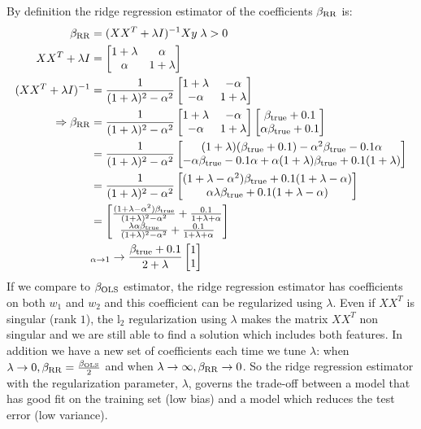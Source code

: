 \documentclass[12pt,twoside]{article}
\begin{document}
\begin{enumerate}
\begin{enumerate}
  \medskip
  By definition the ridge regression estimator of the coefficients $\beta_{\operatorname{RR}}$ is:
 \begin{align*}
 	\beta_{\operatorname{RR}}				&=	(X X^T + \lambda I)^{-1}	X y	\; \lambda > 0	\\
	X X^T + \lambda I			&=	\begin{bmatrix} 1+ \lambda & \alpha \\ \alpha  &1+ \lambda \end{bmatrix} \\
	(X X^T + \lambda I)^{-1}		&=	\frac{1}{(1 + \lambda)^2 - \alpha^2} \begin{bmatrix} 1+ \lambda & -\alpha \\ -\alpha & 1+ \lambda \end{bmatrix} \\	
	\Rightarrow \beta_{\operatorname{RR}}	&=	\frac{1}{(1 + \lambda)^2 - \alpha^2} \begin{bmatrix} 1+ \lambda & -\alpha \\ -\alpha & 1+ \lambda \end{bmatrix} \begin{bmatrix} \beta_{\operatorname{true}} + 0.1 \\ \alpha \beta_{\operatorname{true}} + 0.1 \end{bmatrix} \\
							&=	\frac{1}{(1 + \lambda)^2 - \alpha^2}  \begin{bmatrix} (1+ \lambda) (\beta_{\operatorname{true}} + 0.1) -\alpha^2  \beta_{\operatorname{true}} -0.1 \alpha \\
																-\alpha \beta_{\operatorname{true}}  -0.1 \alpha + \alpha (1+\lambda) \beta_{\operatorname{true}}  + 0.1 (1 + \lambda)  \end{bmatrix} \\
							&=	\frac{1}{(1 + \lambda)^2 - \alpha^2}  \begin{bmatrix} (1+ \lambda  -\alpha^2) \beta_{\operatorname{true}}  + 0.1 (1+ \lambda  -\alpha) \\ 			
																\alpha \lambda \beta_{\operatorname{true}} + 0.1 (1+ \lambda  -\alpha) \end{bmatrix} \\
							&=	 \begin{bmatrix} \frac{(1+ \lambda  -\alpha^2) \beta_{\operatorname{true}}} {(1 + \lambda)^2 - \alpha^2} + \frac{0.1} {1 + \lambda + \alpha} \\
									\frac{ \lambda \alpha  \beta_{\operatorname{true}}} {(1 + \lambda)^2 - \alpha^2} + \frac{0.1} {1 + \lambda + \alpha}  \end{bmatrix} \\
							&_{\alpha \rightarrow 1}\rightarrow \frac{ \beta_{\operatorname{true}} + 0.1}{ 2 + \lambda} \begin{bmatrix} 1  \\ 1 \end{bmatrix} 
 \end{align*} 
If we compare to $\beta_{\operatorname{OLS}}$ estimator,  the ridge regression estimator has coefficients on both $w_1$ and $w_2$ and this coefficient can be regularized using $\lambda$. Even if $XX^T$ is singular (rank $1$), the l$_2$ regularization 
using $\lambda$ makes the matrix $XX^T$ non singular and we are still able to find a solution which includes both features. In addition we have a new set of coefficients each time we tune $\lambda$:
when $\lambda \rightarrow 0, \beta_{\operatorname{RR}} = \frac{\beta_{\operatorname{OLS}}} {2}$ and when $\lambda \rightarrow \infty, \beta_{\operatorname{RR}} \rightarrow 0$. So the ridge regression estimator with the regularization parameter, $\lambda$,
governs the trade-off between a model that has good fit on the training set (low bias) and a model which reduces the test error (low variance). 
 

\end{enumerate}
\end{enumerate}
\end{document}
